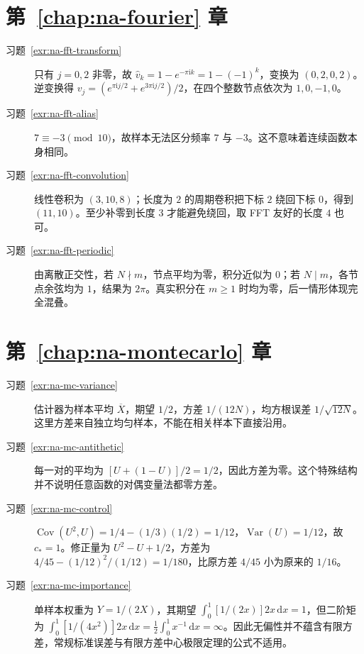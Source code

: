 \section{第~\ref{chap:na-fourier} 章}
\begin{description}
\item[习题~\ref{exr:na-fft-transform}] 只有 $j=0,2$ 非零，故 $\widehat v_k=1-e^{-\pi\mathrm i k}=1-(-1)^k$，变换为 $(0,2,0,2)$。逆变换得 $v_j=(e^{\pi\mathrm i j/2}+e^{3\pi\mathrm i j/2})/2$，在四个整数节点依次为 $1,0,-1,0$。
\item[习题~\ref{exr:na-fft-alias}] $7\equiv-3\pmod{10}$，故样本无法区分频率 $7$ 与 $-3$。这不意味着连续函数本身相同。
\item[习题~\ref{exr:na-fft-convolution}] 线性卷积为 $(3,10,8)$；长度为 $2$ 的周期卷积把下标 $2$ 绕回下标 $0$，得到 $(11,10)$。至少补零到长度 $3$ 才能避免绕回，取 FFT 友好的长度 $4$ 也可。
\item[习题~\ref{exr:na-fft-periodic}] 由离散正交性，若 $N\nmid m$，节点平均为零，积分近似为 $0$；若 $N\mid m$，各节点余弦均为 $1$，结果为 $2\pi$。真实积分在 $m\ge1$ 时均为零，后一情形体现完全混叠。
\end{description}

\section{第~\ref{chap:na-montecarlo} 章}
\begin{description}
\item[习题~\ref{exr:na-mc-variance}] 估计器为样本平均 $\overline X$，期望 $1/2$，方差 $1/(12N)$，均方根误差 $1/\sqrt{12N}$。这里方差来自独立均匀样本，不能在相关样本下直接沿用。
\item[习题~\ref{exr:na-mc-antithetic}] 每一对的平均为 $[U+(1-U)]/2=1/2$，因此方差为零。这个特殊结构并不说明任意函数的对偶变量法都零方差。
\item[习题~\ref{exr:na-mc-control}] $\operatorname{Cov}(U^2,U)=1/4-(1/3)(1/2)=1/12$，$\operatorname{Var}(U)=1/12$，故 $c_*=1$。修正量为 $U^2-U+1/2$，方差为 $4/45-(1/12)^2/(1/12)=1/180$，比原方差 $4/45$ 小为原来的 $1/16$。
\item[习题~\ref{exr:na-mc-importance}] 单样本权重为 $Y=1/(2X)$，其期望 $\int_0^1[1/(2x)]2x\,\mathrm dx=1$，但二阶矩为 $\int_0^1[1/(4x^2)]2x\,\mathrm dx=\tfrac12\int_0^1x^{-1}\,\mathrm dx=\infty$。因此无偏性并不蕴含有限方差，常规标准误差与有限方差中心极限定理的公式不适用。
\end{description}

